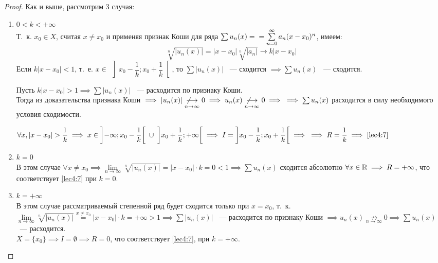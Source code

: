 \documentclass[../../main.tex]{subfiles}
\begin{document}
\begin{proof}
	Как и выше, рассмотрим 3 случая:
	\begin{enumerate}
		\item $0 < k < +\infty$ \\
		Т.~к. $x_0 \in X$, считая $x \ne x_0$ и применяя признак Коши
		для ряда $\sum u_n(x) = \\ = \sum\limits_{n = 0}^{\infty} 
		a_n(x - x_0)^n$, имеем:
		\[ \sqrt[n]{ |u_n(x)| } = |x - x_0| \sqrt[n]{|a_n|} 
		\longrightarrow k|x - x_0|
		  \]
		 Если $k|x - x_0| < 1$, т.~е. 
		 $x \in \: \left] x_0 - \dfrac{1}{k}; x_0 + \dfrac{1}{k} \right[$, то
		 $\sum |u_n(x)| $ ~--- сходится $\implies \sum u_n(x)$ ~--- сходится.
		 
		 Пусть $k|x - x_0| > 1 \implies \sum |u_n(x)|$ ~--- расходится
		 по признаку Коши. \\
		 Тогда из доказательства признака Коши $\implies |u_n(x)| 
		 \underset{n \to \infty}{\not \longrightarrow} 0 \implies u_n(x)
		 \underset{n \to \infty}{\not \longrightarrow} 0 \implies 
		 \\ \implies \sum u_n(x) $
		 расходится в силу необходимого условия сходимости.
		 
		 $\forall x, |x - x_0| > \dfrac{1}{k} \implies 
		 x \in \left]-\infty; x_0 - \dfrac{1}{k} \right[ \;
		 \cup \; \left] x_0 + \dfrac{1}{k}; +\infty\right[ 
		 \implies I = \left]x_0 - \dfrac{1}{k}; x_0 + \dfrac{1}{k} \right[ 
		 \implies \\ \implies R = \dfrac{1}{k} \implies \eqref{lec4:7}$
		 
		 \item $k = 0$ \\
		 В этом случае $\forall x \ne x_0 \implies 
		 \underset{n \to \infty}{\lim} \sqrt[n]{|u_n(x)|} =
		 |x - x_0| \cdot k = 0 < 1 \implies \sum u_n(x)$ 
		 сходится абсолютно 
		 $\forall x \in \mathbb{R} \implies R = +\infty$, что соответствует 
		 \eqref{lec4:7} при $k = 0$.
		 
		 \item $k = +\infty$ \\
		 В этом случае рассматриваемый степенной ряд будет сходится
		 только при $x = x_0$, т.~к. $\underset{n \to \infty}{\lim}
		 \sqrt[n]{|u_n(x)|} \overset{x \ne x_0} = |x - x_0| \cdot k =
		 +\infty > 1 \implies \sum |u_n(x)| $ ~--- расходится по 
		 признаку Коши
		 $\implies u_n(x) \underset{n \to \infty}{\not \longrightarrow} 0 
		 \implies \sum u_n(x)$ ~--- расходится. \\
		 $X = \{ x_0 \} \implies I = \emptyset \implies R = 0$,
		 что соответствует \eqref{lec4:7}, при $k = +\infty$.
	\end{enumerate}
\end{proof}
\end{document}
